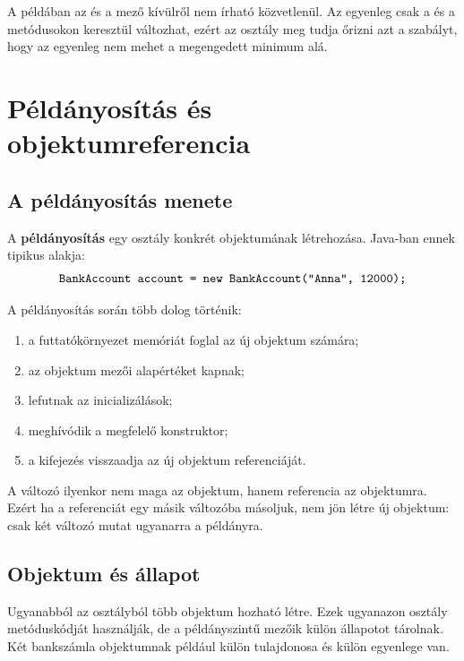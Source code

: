 
A példában az  és a  mező kívülről nem írható közvetlenül. Az egyenleg csak a  és a  metódusokon keresztül változhat, ezért az osztály meg tudja őrizni azt a szabályt, hogy az egyenleg nem mehet a megengedett minimum alá.

\section{Példányosítás és objektumreferencia}

\subsection{A példányosítás menete}

A \textbf{példányosítás} egy osztály konkrét objektumának létrehozása. Java-ban ennek tipikus alakja:
\[
  \texttt{BankAccount account = new BankAccount("Anna", 12000);}
\]

A példányosítás során több dolog történik:

\begin{enumerate}
  \item a futtatókörnyezet memóriát foglal az új objektum számára;
  \item az objektum mezői alapértéket kapnak;
  \item lefutnak az inicializálások;
  \item meghívódik a megfelelő konstruktor;
  \item a  kifejezés visszaadja az új objektum referenciáját.
\end{enumerate}

A változó ilyenkor nem maga az objektum, hanem referencia az objektumra. Ezért ha a referenciát egy másik változóba másoljuk, nem jön létre új objektum: csak két változó mutat ugyanarra a példányra.

\subsection{Objektum és állapot}

Ugyanabból az osztályból több objektum hozható létre. Ezek ugyanazon osztály metóduskódját használják, de a példányszintű mezőik külön állapotot tárolnak. Két bankszámla objektumnak például külön tulajdonosa és külön egyenlege van.

